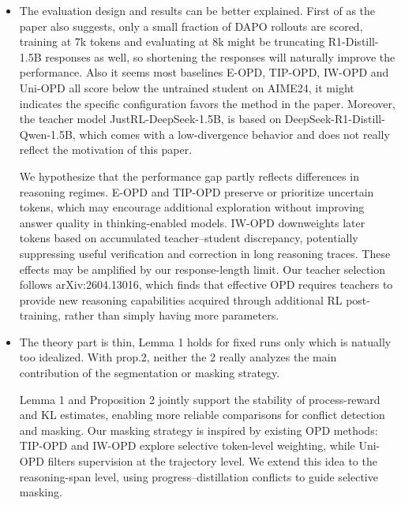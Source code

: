 \documentclass[11pt,a4paper]{article}
\begin{document}
\begin{itemize}
\item The evaluation design and results can be better explained. First of as the paper also suggests, only a small fraction of DAPO rollouts are scored, training at 7k tokens and evaluating at 8k might be truncating R1-Distill-1.5B responses as well, so shortening the responses will naturally improve the performance. Also it seems most baselines E-OPD, TIP-OPD, IW-OPD and Uni-OPD all score below the untrained student on AIME24, it might indicates the specific configuration favors the method in the paper. Moreover, the teacher model JustRL-DeepSeek-1.5B, is based on DeepSeek-R1-Distill-Qwen-1.5B, which comes with a low-divergence behavior and does not really reflect the motivation of this paper.
\par{}
\begin{responsebox}[frametitle={Response to W3}]
We hypothesize that the performance gap partly reflects differences in reasoning regimes. E-OPD and TIP-OPD preserve or prioritize uncertain tokens, which may encourage additional exploration without improving answer quality in thinking-enabled models. IW-OPD downweights later tokens based on accumulated teacher--student discrepancy, potentially suppressing useful verification and correction in long reasoning traces. These effects may be amplified by our response-length limit. Our teacher selection follows arXiv:2604.13016, which finds that effective OPD requires teachers to provide new reasoning capabilities acquired through additional RL post-training, rather than simply having more parameters.
\end{responsebox}

\item The theory part is thin, Lemma 1 holds for fixed runs only which is natually too idealized. With prop.2, neither the 2 really analyzes the main contribution of the segmentation or masking strategy.
\par{}
\begin{responsebox}[frametitle={Response to W4}]
Lemma 1 and Proposition 2 jointly support the stability of process-reward and KL estimates, enabling more reliable comparisons for conflict detection and masking. Our masking strategy is inspired by existing OPD methods: TIP-OPD and IW-OPD explore selective token-level weighting, while Uni-OPD filters supervision at the trajectory level. We extend this idea to the reasoning-span level, using progress--distillation conflicts to guide selective masking.
\end{responsebox}

\end{itemize}
\end{document}
